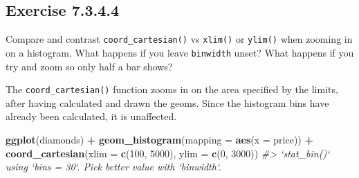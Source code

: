 \documentclass[]{book}
\newenvironment{Shaded}{\begin{snugshade}}{\end{snugshade}}
\newcommand{\CommentTok}[1]{\textcolor[rgb]{0.56,0.35,0.01}{\textit{#1}}}
\newcommand{\DataTypeTok}[1]{\textcolor[rgb]{0.13,0.29,0.53}{#1}}
\newcommand{\DecValTok}[1]{\textcolor[rgb]{0.00,0.00,0.81}{#1}}
\newcommand{\FloatTok}[1]{\textcolor[rgb]{0.00,0.00,0.81}{#1}}
\newcommand{\KeywordTok}[1]{\textcolor[rgb]{0.13,0.29,0.53}{\textbf{#1}}}
\newcommand{\NormalTok}[1]{#1}
\newcommand{\OperatorTok}[1]{\textcolor[rgb]{0.81,0.36,0.00}{\textbf{#1}}}
\newcommand{\StringTok}[1]{\textcolor[rgb]{0.31,0.60,0.02}{#1}}
\theoremstyle{plain}
\theoremstyle{remark}
\begin{document}
\begin{Shaded}
\end{Shaded}

\hypertarget{exercise-7.3.4.4}{%
\subsection*{\texorpdfstring{Exercise
{7.3.4.4}}{Exercise 7.3.4.4}}\label{exercise-7.3.4.4}}

Compare and contrast \texttt{coord\_cartesian()} vs \texttt{xlim()} or
\texttt{ylim()} when zooming in on a histogram. What happens if you
leave \texttt{binwidth} unset? What happens if you try and zoom so only
half a bar shows?

The \texttt{coord\_cartesian()} function zooms in on the area specified
by the limits, after having calculated and drawn the geoms. Since the
histogram bins have already been calculated, it is unaffected.

\begin{Shaded}
\begin{Highlighting}[]
\KeywordTok{ggplot}\NormalTok{(diamonds) }\OperatorTok{+}
\StringTok{  }\KeywordTok{geom_histogram}\NormalTok{(}\DataTypeTok{mapping =} \KeywordTok{aes}\NormalTok{(}\DataTypeTok{x =}\NormalTok{ price)) }\OperatorTok{+}
\StringTok{  }\KeywordTok{coord_cartesian}\NormalTok{(}\DataTypeTok{xlim =} \KeywordTok{c}\NormalTok{(}\DecValTok{100}\NormalTok{, }\DecValTok{5000}\NormalTok{), }\DataTypeTok{ylim =} \KeywordTok{c}\NormalTok{(}\DecValTok{0}\NormalTok{, }\DecValTok{3000}\NormalTok{))}
\CommentTok{#> `stat_bin()` using `bins = 30`. Pick better value with `binwidth`.}
\end{Highlighting}
\end{Shaded}
\end{document}
